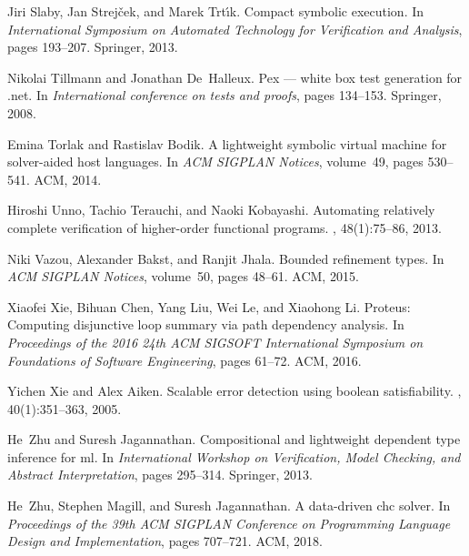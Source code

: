 \begin{thebibliography}{10}
Jiri Slaby, Jan Strej{\v{c}}ek, and Marek Trt{\'\i}k.
\newblock Compact symbolic execution.
\newblock In {\em International Symposium on Automated Technology for
  Verification and Analysis}, pages 193--207. Springer, 2013.

Nikolai Tillmann and Jonathan De~Halleux.
\newblock Pex --- white box test generation for .net.
\newblock In {\em International conference on tests and proofs}, pages
  134--153. Springer, 2008.

Emina Torlak and Rastislav Bodik.
\newblock A lightweight symbolic virtual machine for solver-aided host
  languages.
\newblock In {\em ACM SIGPLAN Notices}, volume~49, pages 530--541. ACM, 2014.

Hiroshi Unno, Tachio Terauchi, and Naoki Kobayashi.
\newblock Automating relatively complete verification of higher-order
  functional programs.
, 48(1):75--86, 2013.

Niki Vazou, Alexander Bakst, and Ranjit Jhala.
\newblock Bounded refinement types.
\newblock In {\em ACM SIGPLAN Notices}, volume~50, pages 48--61. ACM, 2015.

Xiaofei Xie, Bihuan Chen, Yang Liu, Wei Le, and Xiaohong Li.
\newblock Proteus: Computing disjunctive loop summary via path dependency
  analysis.
\newblock In {\em Proceedings of the 2016 24th ACM SIGSOFT International
  Symposium on Foundations of Software Engineering}, pages 61--72. ACM, 2016.

Yichen Xie and Alex Aiken.
\newblock Scalable error detection using boolean satisfiability.
, 40(1):351--363, 2005.

He~Zhu and Suresh Jagannathan.
\newblock Compositional and lightweight dependent type inference for ml.
\newblock In {\em International Workshop on Verification, Model Checking, and
  Abstract Interpretation}, pages 295--314. Springer, 2013.

He~Zhu, Stephen Magill, and Suresh Jagannathan.
\newblock A data-driven chc solver.
\newblock In {\em Proceedings of the 39th ACM SIGPLAN Conference on Programming
  Language Design and Implementation}, pages 707--721. ACM, 2018.

\end{thebibliography}

